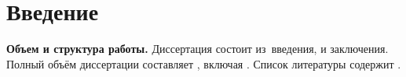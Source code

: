 \chapter*{Введение}                         %
\newcommand{\actuality}{}
\newcommand{\progress}{}
\newcommand{\aim}{{\textbf\aimTXT}}
\newcommand{\tasks}{\textbf{\tasksTXT}}
\newcommand{\novelty}{\textbf{\noveltyTXT}}
\newcommand{\influence}{\textbf{\influenceTXT}}
\newcommand{\methods}{\textbf{\methodsTXT}}
\newcommand{\defpositions}{\textbf{\defpositionsTXT}}
\newcommand{\reliability}{\textbf{\reliabilityTXT}}
\newcommand{\probation}{\textbf{\probationTXT}}
\newcommand{\contribution}{\textbf{\contributionTXT}}
\newcommand{\publications}{\textbf{\publicationsTXT}}


\textbf{Объем и структура работы.} Диссертация состоит из~введения,
 и
заключения.
%
Полный объём диссертации составляет
, включая
.
Список литературы содержит
.


